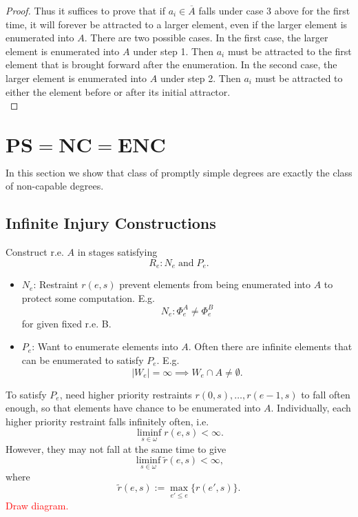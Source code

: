 \documentclass{article}
\newcommand{\COMMENT}[1]{\textcolor{red}{#1}}
\begin{document}
\begin{proof}
    Thus it suffices to prove that if $a_i\in\overline{A}$ falls under case
    3 above for the first time, it will forever be attracted to a larger
    element, even if the larger element is enumerated into $A$. There are
    two possible cases. In the first case, the larger element is enumerated
    into $A$ under step 1. Then $a_i$ must be attracted to the first
    element that is brought forward after the enumeration. In the second
    case, the larger element is enumerated into $A$ under step 2. Then
    $a_i$ must be attracted to either the element before or after its
    initial attractor. \\
  \end{proof}

\section{$\bm{PS}=\bm{NC}=\bm{ENC}$}
  In this section we show that class of promptly simple degrees are exactly
  the class of non-capable degrees.

\subsection{Infinite Injury Constructions}
  \label{section:infinite-injury}
  Construct r.e. $A$ in stages satisfying
  \[R_e: N_e\; \text{and}\; P_e.\]
  \begin{itemize}
    \item $N_e$: Restraint $r(e,s)$ prevent elements from being enumerated
      into $A$ to protect some computation. E.g.
      \[N_e: \Phi_e^A\neq \Phi_e^B\]
      for given fixed r.e. B.

    \item $P_e$: Want to enumerate elements into $A$. Often there are
      infinite elements that can be enumerated to satisfy $P_e$. E.g.
      \[|W_e|=\infty \implies W_e\cap A\neq\emptyset.\]
  \end{itemize}

  To satisfy $P_e$, need higher priority restraints
  $r(0,s),\ldots,r(e-1,s)$ to fall often enough, so that elements have
  chance to be enumerated into $A$. Individually, each higher priority
  restraint falls infinitely often, i.e.
  \[\liminf_{s\in\omega} r(e,s)<\infty.\]
  However, they may not fall at the same time to give
  \begin{equation}
    \liminf_{s\in\omega}\tilde{r}(e,s)<\infty,
    \label{eqn:liminf}
  \end{equation}
  where
  \[\tilde{r}(e,s) :=\max_{e'\leq e}\{r(e',s)\}.\]
  \COMMENT{Draw diagram.}\\
\end{document}
